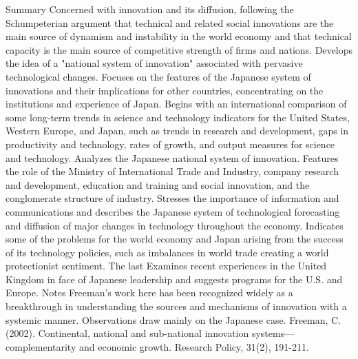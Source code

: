\documentclass[a4paper,11pt]{article}
\begin{document}
Summary
Concerned with innovation and its diffusion, following the Schumpeterian argument that technical and related social innovations are the main source of dynamism and instability in the world economy and that technical capacity is the main source of competitive strength of firms and nations. Develops the idea of a "national system of innovation" associated with pervasive technological changes. Focuses on the features of the Japanese system of innovations and their implications for other countries, concentrating on the institutions and experience of Japan. Begins with an international comparison of some long-term trends in science and technology indicators for the United States, Western Europe, and Japan, such as trends in research and development, gaps in productivity and technology, rates of growth, and output measures for science and technology.
Analyzes the Japanese national system of innovation. Features the role of the Ministry of International Trade and Industry, company research and development, education and training and social innovation, and the conglomerate structure of industry. Stresses the importance of information and communications and describes the Japanese system of technological forecasting and diffusion of major changes in technology throughout the economy. Indicates some of the problems for the world economy and Japan arising from the success of its technology policies, such as imbalances in world trade creating a world protectionist sentiment. The last Examines recent experiences in the United Kingdom in face of Japanese leadership and suggests programs for the U.S. and Europe.
Notes
Freeman's work here has been recognized widely as a breakthrough in understanding the sources and mechanisms of innovation with a systemic manner. Observations draw mainly on the Japanese case.
Freeman, C. (2002). Continental, national and sub-national innovation systems— complementarity and economic growth. Research Policy, 31(2), 191-211.
 
\end{document}
